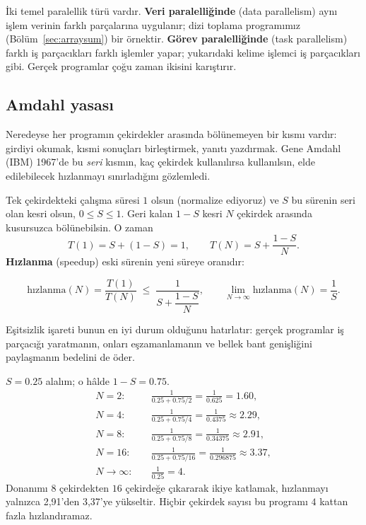 \documentclass[11pt,a4paper]{article}
\newcommand{\term}[1]{\textbf{\color{mintdeep}#1}}
\begin{document}
İki temel paralellik türü vardır. \term{Veri paralelliğinde} (data parallelism) aynı işlem verinin farklı parçalarına uygulanır; dizi toplama programımız (Bölüm~\ref{sec:arraysum}) bir örnektir. \term{Görev paralelliğinde} (task parallelism) farklı iş parçacıkları farklı işlemler yapar; yukarıdaki kelime işlemci iş parçacıkları gibi. Gerçek programlar çoğu zaman ikisini karıştırır.

\subsection{Amdahl yasası}

Neredeyse her programın çekirdekler arasında bölünemeyen bir kısmı vardır: girdiyi okumak, kısmi sonuçları birleştirmek, yanıtı yazdırmak. Gene Amdahl (IBM) 1967'de bu \emph{seri} kısmın, kaç çekirdek kullanılırsa kullanılsın, elde edilebilecek hızlanmayı sınırladığını gözlemledi.

Tek çekirdekteki çalışma süresi $1$ olsun (normalize ediyoruz) ve $S$ bu sürenin seri olan kesri olsun, $0 \le S \le 1$. Geri kalan $1-S$ kesri $N$ çekirdek arasında kusursuzca bölünebilsin. O zaman
\[
T(1) = S + (1-S) = 1, \qquad T(N) = S + \frac{1-S}{N}.
\]
\term{Hızlanma} (speedup) eski sürenin yeni süreye oranıdır:
\begin{keyidea}
\[
\text{hızlanma}(N) = \frac{T(1)}{T(N)} \;\le\; \frac{1}{S + \dfrac{1-S}{N}},
\qquad
\lim_{N\to\infty} \text{hızlanma}(N) = \frac{1}{S}.
\]
\end{keyidea}
Eşitsizlik işareti bunun en iyi durum olduğunu hatırlatır: gerçek programlar iş parçacığı yaratmanın, onları eşzamanlamanın ve bellek bant genişliğini paylaşmanın bedelini de öder.

\begin{example}
$S = 0.25$ alalım; o hâlde $1-S = 0.75$.
\begin{align*}
N=2:&\quad \frac{1}{0.25 + 0.75/2} = \frac{1}{0.625} = 1.60,\\
N=4:&\quad \frac{1}{0.25 + 0.75/4} = \frac{1}{0.4375} \approx 2.29,\\
N=8:&\quad \frac{1}{0.25 + 0.75/8} = \frac{1}{0.34375} \approx 2.91,\\
N=16:&\quad \frac{1}{0.25 + 0.75/16} = \frac{1}{0.296875} \approx 3.37,\\
N\to\infty:&\quad \frac{1}{0.25} = 4.
\end{align*}
Donanımı $8$ çekirdekten $16$ çekirdeğe çıkararak ikiye katlamak, hızlanmayı yalnızca 2,91'den 3,37'ye yükseltir. Hiçbir çekirdek sayısı bu programı $4$ kattan fazla hızlandıramaz.
\end{example}
\end{document}
